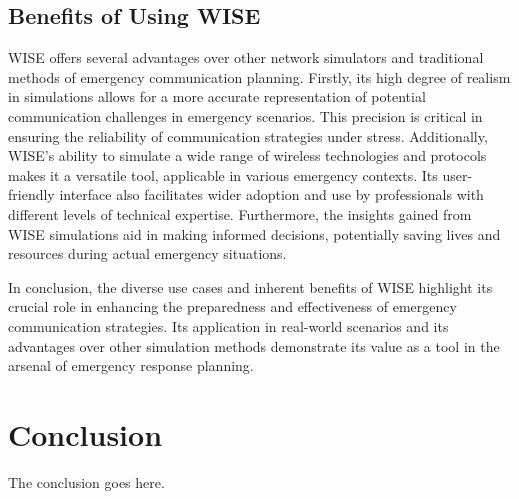 \documentclass[journal]{IEEEtran}
\begin{document}
\subsection{Benefits of Using WISE}
WISE offers several advantages over other network simulators and traditional methods of emergency communication planning. Firstly, its high degree of realism in simulations allows for a more accurate representation of potential communication challenges in emergency scenarios. This precision is critical in ensuring the reliability of communication strategies under stress. Additionally, WISE's ability to simulate a wide range of wireless technologies and protocols makes it a versatile tool, applicable in various emergency contexts. Its user-friendly interface also facilitates wider adoption and use by professionals with different levels of technical expertise. Furthermore, the insights gained from WISE simulations aid in making informed decisions, potentially saving lives and resources during actual emergency situations.

In conclusion, the diverse use cases and inherent benefits of WISE highlight its crucial role in enhancing the preparedness and effectiveness of emergency communication strategies. Its application in real-world scenarios and its advantages over other simulation methods demonstrate its value as a tool in the arsenal of emergency response planning.

\section{Conclusion}
The conclusion goes here.






%
\end{document}
